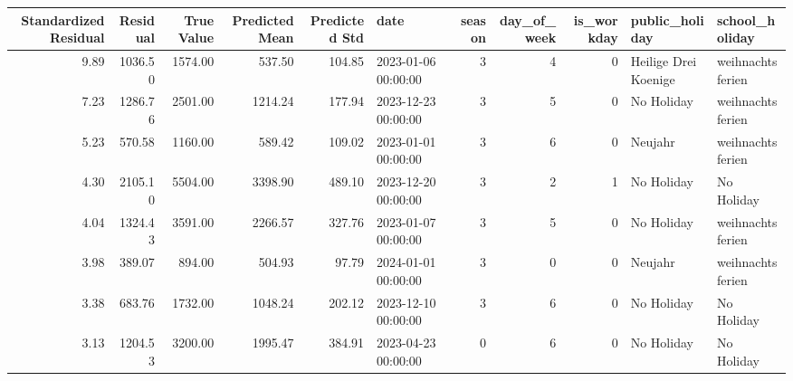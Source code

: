 \begin{tabular}{rrrrrlrrrll}
\toprule
Standardized Residual & Residual & True Value & Predicted Mean & Predicted Std & date & season & day_of_week & is_workday & public_holiday & school_holiday \\
\midrule
9.89 & 1036.50 & 1574.00 & 537.50 & 104.85 & 2023-01-06 00:00:00 & 3 & 4 & 0 & Heilige Drei Koenige & weihnachtsferien \\
7.23 & 1286.76 & 2501.00 & 1214.24 & 177.94 & 2023-12-23 00:00:00 & 3 & 5 & 0 & No Holiday & weihnachtsferien \\
5.23 & 570.58 & 1160.00 & 589.42 & 109.02 & 2023-01-01 00:00:00 & 3 & 6 & 0 & Neujahr & weihnachtsferien \\
4.30 & 2105.10 & 5504.00 & 3398.90 & 489.10 & 2023-12-20 00:00:00 & 3 & 2 & 1 & No Holiday & No Holiday \\
4.04 & 1324.43 & 3591.00 & 2266.57 & 327.76 & 2023-01-07 00:00:00 & 3 & 5 & 0 & No Holiday & weihnachtsferien \\
3.98 & 389.07 & 894.00 & 504.93 & 97.79 & 2024-01-01 00:00:00 & 3 & 0 & 0 & Neujahr & weihnachtsferien \\
3.38 & 683.76 & 1732.00 & 1048.24 & 202.12 & 2023-12-10 00:00:00 & 3 & 6 & 0 & No Holiday & No Holiday \\
3.13 & 1204.53 & 3200.00 & 1995.47 & 384.91 & 2023-04-23 00:00:00 & 0 & 6 & 0 & No Holiday & No Holiday \\
\bottomrule
\end{tabular}
